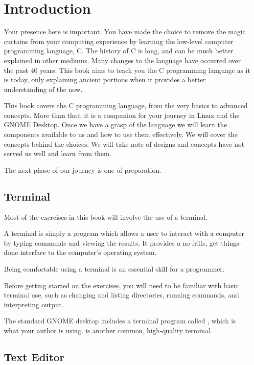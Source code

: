 \chapter{Introduction}

Your presence here is important. You have made the choice to remove the magic
curtains from your computing experience by learning the low-level computer
programming language, C. The history of C is long, and can be much better
explained in other mediums. Many changes to the language have occurred over
the past 40 years. This book aims to teach you the C programming language as
it is today, only explaining ancient portions when it provides a better
understanding of the now.

This book covers the C programming language, from the very basics to advanced
concepts. More than that, it is a companion for your journey in Linux and the
GNOME Desktop. Once we have a grasp of the language we will learn the
components available to us and how to use them effectively. We will cover the
concepts behind the choices. We will take note of designs and concepts have
not served us well and learn from them.

The next phase of our journey is one of preparation.


\section{Terminal}

Most of the exercises in this book will involve the use of a terminal. 

A terminal is simply a program which allows a user to interact with a computer
by typing commands and viewing the results.  It provides a no-frills, 
get-things-done interface to the computer's operating system.

Being comfortable using a terminal is an essential skill for a programmer.

Before getting started on the exercises, you will need to be familiar with
basic terminal use, such as changing and listing directories, running commands, 
and interpreting output.

The standard GNOME desktop includes a terminal program called 
, which is what your author is using.  is
another common, high-quality terminal. 


\section{Text Editor}

